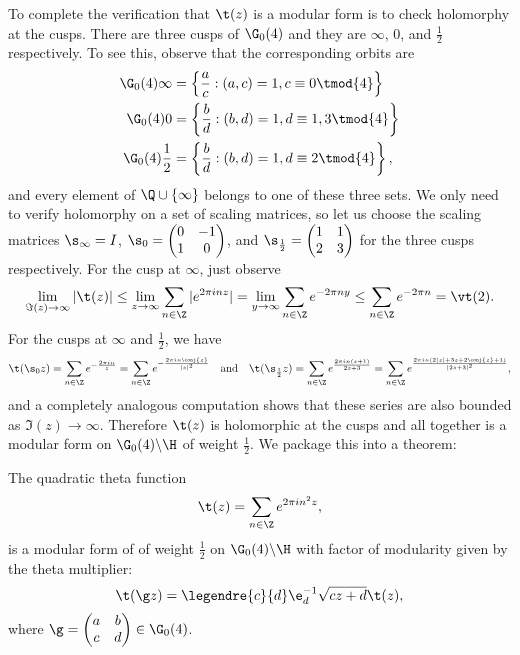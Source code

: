       To complete the verification that $\t(z)$ is a modular form is to check holomorphy at the cusps. There are three cusps of $\G_{0}(4)$ and they are $\infty$, $0$, and $\frac{1}{2}$ respectively. To see this, observe that the corresponding orbits are
      \begin{align*}
        \G_{0}(4)\infty &= \left\{\frac{a}{c}:(a,c) = 1, c \equiv 0 \tmod{4} \right\} \\
        \G_{0}(4)0 &= \left\{\frac{b}{d}:(b,d) = 1, d \equiv 1,3 \tmod{4} \right\} \\
        \G_{0}(4)\frac{1}{2} &= \left\{\frac{b}{d}:(b,d) = 1, d \equiv 2 \tmod{4} \right\},
      \end{align*}
      and every element of $\Q \cup \{\infty\}$ belongs to one of these three sets. We only need to verify holomorphy on a set of scaling matrices, so let us choose the scaling matrices $\s_{\infty} = I$, $\s_{0} = \begin{pmatrix} 0 & -1 \\ 1 & 0 \end{pmatrix}$, and $\s_{\frac{1}{2}} = \begin{pmatrix} 1 & 1 \\ 2 & 3 \end{pmatrix}$ for the three cusps respectively. For the cusp at $\infty$, just observe
      \[
        \lim_{\Im(z) \to \infty}|\t(z)| \le \lim_{z \to \infty}\sum_{n \in \Z}|e^{2\pi inz}| = \lim_{y \to \infty}\sum_{n \in \Z}e^{-2\pi ny} \le \sum_{n \in \Z}e^{-2\pi n} = \vt(2).
      \]
      For the cusps at $\infty$ and $\frac{1}{2}$, we have
      \[
        \t(\s_{0} z) = \sum_{n \in \Z}e^{-\frac{2\pi in}{z}} = \sum_{n \in \Z}e^{-\frac{2\pi in\conj{z}}{|z|^{2}}} \quad \text{and} \quad \t(\s_{\frac{1}{2}} z) = \sum_{n \in \Z}e^{\frac{2\pi in(z+1)}{2z+3}} = \sum_{n \in \Z}e^{\frac{2\pi in(2|z|+3z+2\conj{z}+1)}{|2z+3|^{2}}},
      \]
      and a completely analogous computation shows that these series are also bounded as $\Im(z) \to \infty$. Therefore $\t(z)$ is holomorphic at the cusps and all together is a modular form on $\G_{0}(4)\backslash\H$ of weight $\frac{1}{2}$. We package this into a theorem:

      \begin{theorem}
        The quadratic theta function
        \[
            \t(z) = \sum_{n \in \Z}e^{2\pi in^{2}z},
        \]
        is a modular form of of weight $\frac{1}{2}$ on $\G_{0}(4)\backslash\H$ with factor of modularity given by the theta multiplier:
        \[
          \t(\g z) = \legendre{c}{d}\e_{d}^{-1}\sqrt{cz+d}\t(z),
        \]
        where $\g = \begin{pmatrix} a & b \\ c & d \end{pmatrix} \in \G_{0}(4)$.
      \end{theorem}

